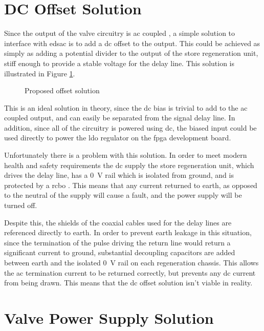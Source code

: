 \section{DC Offset Solution} \label{sec:power-dc-offset}
Since the output of the valve circuitry is \gls{ac} coupled , a simple solution to interface with \gls{edsac} is to add a \gls{dc} offset to the output. This could be achieved as simply as adding a potential divider to the output of the store regeneration unit, stiff enough to provide a stable voltage for the delay line. This solution is illustrated in Figure \ref{fig:dc-offset}.

\begin{figure}[ht]
	\centering
	\dummyfigure
	\caption{Proposed  offset solution}
	\label{fig:dc-offset}
\end{figure}

This is an ideal solution in theory, since the \gls{dc} bias is trivial to add to the \gls{ac} coupled output, and can easily be separated from the signal delay line. In addition, since all of the circuitry is powered using \gls{dc}, the biased input could be used directly to power the \gls{ldo} regulator on the \gls{fpga} development board.

Unfortunately there is a problem with this solution. In order to meet modern health and safety requirements the \gls{dc} supply the store regeneration unit, which drives the delay line, has a \SI{0}{\volt} rail which is isolated from ground, and is protected by a \gls{rcbo} \cite{passmore2015}. This means that any current returned to earth, as opposed to the neutral of the supply will cause a fault, and the power supply will be turned off.

Despite this, the shields of the coaxial cables used for the delay lines are referenced directly to earth. In order to prevent earth leakage in this situation, since the termination of the pulse driving the return line would return a significant current to ground, substantial decoupling capacitors are added between earth and the isolated \SI{0}{\volt} rail on each regeneration chassis. This allows the \gls{ac} termination current to be returned correctly, but prevents any \gls{dc} current from being drawn. This means that the \gls{dc} offset solution isn't viable in reality.

\section{Valve Power Supply Solution} \label{sec:power-valve-supply}


